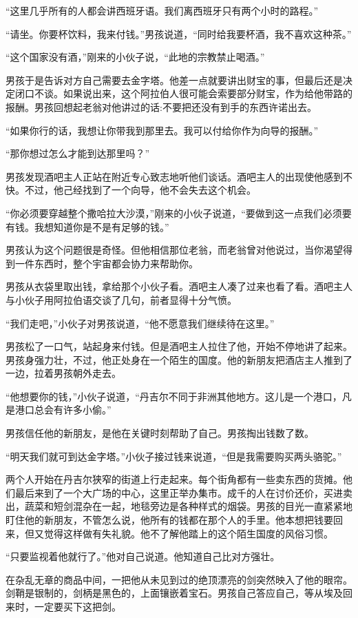 \documentclass[twoside,openany]{book}
\begin{document}
“这里几乎所有的人都会讲西班牙语。我们离西班牙只有两个小时的路程。”

“请坐。你要杯饮料，我来付钱。”男孩说道，“同时给我要杯酒，我不喜欢这种茶。”

“这个国家没有酒，”刚来的小伙子说，“此地的宗教禁止喝酒。”

男孩于是告诉对方自己需要去金字塔。他差一点就要讲出财宝的事，但最后还是决定闭口不谈。如果说出来，这个阿拉伯人很可能会索要部分财宝，作为给他带路的报酬。男孩回想起老翁对他讲过的话:不要把还没有到手的东西许诺出去。

“如果你行的话，我想让你带我到那里去。我可以付给你作为向导的报酬。”

“那你想过怎么才能到达那里吗？”

男孩发现酒吧主人正站在附近专心致志地听他们谈话。酒吧主人的出现使他感到不快。不过，他己经找到了一个向导，他不会失去这个机会。

“你必须要穿越整个撒哈拉大沙漠，”刚来的小伙子说道，“要做到这一点我们必须要有钱。我想知道你是不是有足够的钱。”

男孩认为这个问题很是奇怪。但他相信那位老翁，而老翁曾对他说过，当你渴望得到一件东西时，整个宇宙都会协力来帮助你。

男孩从衣袋里取出钱，拿给那个小伙子看。酒吧主人凑了过来也看了看。酒吧主人与小伙子用阿拉伯语交谈了几句，前者显得十分气愤。

“我们走吧，”小伙子对男孩说道，“他不愿意我们继续待在这里。”

男孩松了一口气，站起身来付钱。但是酒吧主人拉住了他，开始不停地讲了起来。男孩身强力壮，不过，他正处身在一个陌生的国度。他的新朋友把酒店主人推到了一边，拉着男孩朝外走去。

“他想要你的钱，”小伙子说道，“丹吉尔不同于非洲其他地方。这儿是一个港口，凡是港口总会有许多小偷。”

男孩信任他的新朋友，是他在关键时刻帮助了自己。男孩掏出钱数了数。

“明天我们就可到达金字塔。”小伙子接过钱来说道，“但是我需要购买两头骆驼。”

两个人开始在丹吉尔狭窄的街道上行走起来。每个街角都有一些卖东西的货摊。他们最后来到了一个大广场的中心，这里正举办集市。成千的人在讨价还价，买进卖出，蔬菜和短剑混杂在一起，地毯旁边是各种样式的烟袋。男孩的目光一直紧紧地盯住他的新朋友，不管怎么说，他所有的钱都在那个人的手里。他本想把钱要回来，但又觉得这样做有失礼貌。他不了解他踏上的这个陌生国度的风俗习惯。

“只要监视着他就行了。”他对自己说道。他知道自己比对方强壮。

在杂乱无章的商品中间，一把他从未见到过的绝顶漂亮的剑突然映入了他的眼帘。剑鞘是银制的，剑柄是黑色的，上面镶嵌着宝石。男孩自己答应自己，等从埃及回来时，一定要买下这把剑。
\end{document}
